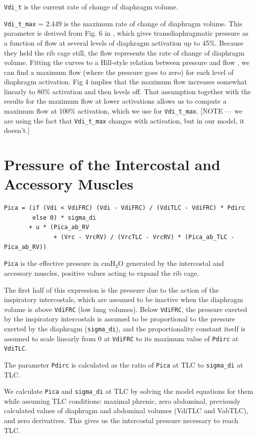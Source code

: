 \documentclass[12pt,openany,oneside]{book}
\begin{document}
\verb~Vdi_t~ is the current rate of change of diaphragm volume.

\verb~Vdi_t_max~ = 2.449 is the maximum rate of change of diaphragm
volume.  This parameter is derived from Fig. 6 in
\citet{Goldman01061978}, which gives transdiaphragmatic pressure as a
function of flow at several levels of diaphragm activation up to 45\%.
Because they held the rib cage still, the flow represents the rate of
change of diaphragm volume.  Fitting the curves to a Hill-style
relation between pressure and flow \citep{Younes01101981}, we can find
a maximum flow (where the pressure goes to zero) for each level of
diaphragm activation.  \citet{Chow01031999} Fig 4 implies that the
maximum flow increases somewhat linearly to 80\% activation and then
levels off.  That assumption together with the results for the maximum
flow at lower activations allows us to compute a maximum flow at 100\%
activation, which we use for \verb~Vdi_t_max~. [NOTE --- we are using
the fact that \verb~Vdi_t_max~ changes with activation, but in our
model, it doesn't.]

\section{Pressure of the Intercostal and Accessory Muscles}
\begin{verbatim}
Pica = (if (Vdi < VdiFRC) (Vdi - VdiFRC) / (VdiTLC - VdiFRC) * Pdirc
        else 0) * sigma_di
       + u * (Pica_ab_RV
              + (Vrc - VrcRV) / (VrcTLC - VrcRV) * (Pica_ab_TLC - Pica_ab_RV))
\end{verbatim}

\verb~Pica~ is the effective pressure in cmH$_2$O generated by the
intercostal and accessory muscles, positive values acting to expand
the rib cage.

The first half of this expression is the pressure due to the action of
the inspiratory intercostals, which are assumed to be inactive when
the diaphragm volume is above \verb~VdiFRC~ (low lung volumes).  Below
\verb~VdiFRC~, the pressure exerted by the inspiratory intercostals is
assumed to be proportional to the pressure exerted by the diaphragm
(\verb~sigma_di~), and the proportionality constant itself is assumed
to scale linearly from 0 at \verb~VdiFRC~ to its maximum value of
\verb~Pdirc~ at \verb~VdiTLC~.

The parameter \verb~Pdirc~ is calculated as the ratio of \verb~Pica~
at TLC to \verb~sigma_di~ at TLC.

We calculate \verb~Pica~ and \verb~sigma_di~ at TLC by solving the
model equations for them while assuming TLC conditions: maximal
phrenic, zero abdominal, previously calculated values of diaphragm and
abdominal volumes (VdiTLC and VabTLC), and zero derivatives.  This
gives us the intercostal pressure necessary to reach TLC.
\end{document}
